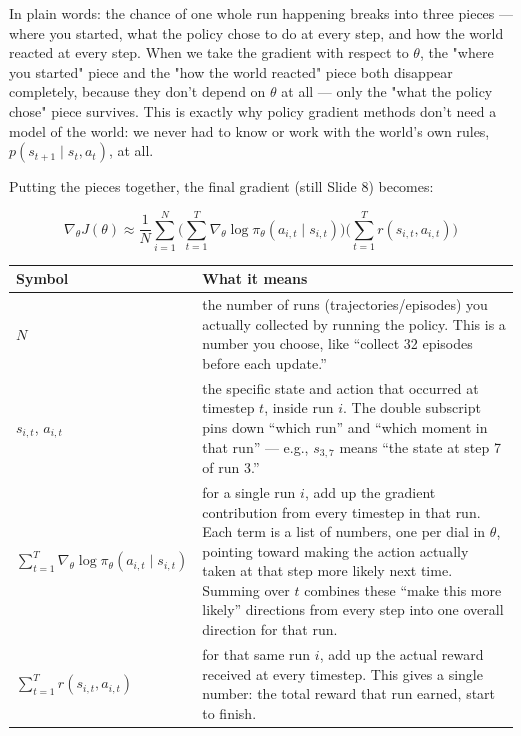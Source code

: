\documentclass[11pt]{article}
\begin{document}
In plain words: the chance of one whole run happening breaks into three pieces --- where you started, what the policy chose to do at every step, and how the world reacted at every step. When we take the gradient with respect to $\theta$, the "where you started" piece and the "how the world reacted" piece both disappear completely, because they don't depend on $\theta$ at all --- only the "what the policy chose" piece survives. This is exactly why policy gradient methods don't need a model of the world: we never had to know or work with the world's own rules, $p(s_{t+1}\mid s_t,a_t)$, at all.

Putting the pieces together, the final gradient (still Slide 8) becomes:
\begin{small}
$$\nabla_\theta J(\theta) \approx \frac{1}{N}\sum_{i=1}^{N}\Big(\sum_{t=1}^{T}\nabla_\theta\log\pi_\theta(a_{i,t}\mid s_{i,t})\Big)\Big(\sum_{t=1}^{T} r(s_{i,t},a_{i,t})\Big)$$
\end{small}
\begin{center}
\begin{tabular}{@{} >{\raggedright\arraybackslash}p{} >{\raggedright\arraybackslash}p{} @{}}
\toprule
\textbf{Symbol} & \textbf{What it means} \\
\midrule
$N$ & the number of runs (trajectories/episodes) you actually collected by running the policy. This is a number you choose, like ``collect 32 episodes before each update.'' \\
$s_{i,t}$, $a_{i,t}$ & the specific state and action that occurred at timestep $t$, inside run $i$. The double subscript pins down ``which run'' and ``which moment in that run'' --- e.g., $s_{3,7}$ means ``the state at step 7 of run 3.'' \\
$\sum_{t=1}^{T}\nabla_\theta\log\pi_\theta(a_{i,t}\mid s_{i,t})$ & for a single run $i$, add up the gradient contribution from every timestep in that run. Each term is a list of numbers, one per dial in $\theta$, pointing toward making the action actually taken at that step more likely next time. Summing over $t$ combines these ``make this more likely'' directions from every step into one overall direction for that run. \\
$\sum_{t=1}^{T} r(s_{i,t},a_{i,t})$ & for that same run $i$, add up the actual reward received at every timestep. This gives a single number: the total reward that run earned, start to finish. \\
\bottomrule
\end{tabular}
\end{center}
\end{document}
